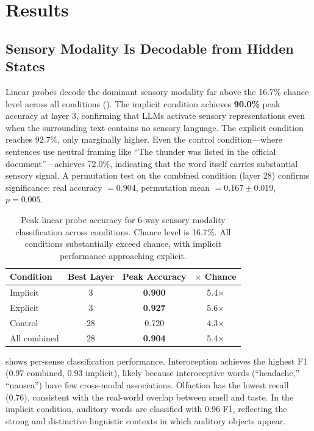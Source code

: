 \section{Results}
\label{sec:results}

\subsection{Sensory Modality Is Decodable from Hidden States}
\label{sec:results-probing}

Linear probes decode the dominant sensory modality far above the 16.7\% chance level across all conditions (). The implicit condition achieves \textbf{90.0\%} peak accuracy at layer 3, confirming that LLMs activate sensory representations even when the surrounding text contains no sensory language. The explicit condition reaches 92.7\%, only marginally higher. Even the control condition---where sentences use neutral framing like ``The thunder was listed in the official document''---achieves 72.0\%, indicating that the word itself carries substantial sensory signal. A permutation test on the combined condition (layer 28) confirms significance: real accuracy $= 0.904$, permutation mean $= 0.167 \pm 0.019$, $p = 0.005$.

\begin{table}[t]
\centering
\caption{Peak linear probe accuracy for 6-way sensory modality classification across conditions. Chance level is 16.7\%. All conditions substantially exceed chance, with implicit performance approaching explicit.}
\label{tab:probe_accuracy}
\begin{tabular}{@{}lccc@{}}
\toprule
\textbf{Condition} & \textbf{Best Layer} & \textbf{Peak Accuracy} & \textbf{$\times$ Chance} \\
\midrule
Implicit & 3 & {\bf 0.900} & 5.4$\times$ \\
Explicit & 3 & {\bf 0.927} & 5.6$\times$ \\
Control & 28 & 0.720 & 4.3$\times$ \\
All combined & 28 & {\bf 0.904} & 5.4$\times$ \\
\bottomrule
\end{tabular}
\end{table}

 shows per-sense classification performance. Interoception achieves the highest F1 (0.97 combined, 0.93 implicit), likely because interoceptive words (\eg ``headache,'' ``nausea'') have few cross-modal associations. Olfaction has the lowest recall (0.76), consistent with the real-world overlap between smell and taste. In the implicit condition, auditory words are classified with 0.96 F1, reflecting the strong and distinctive linguistic contexts in which auditory objects appear.

